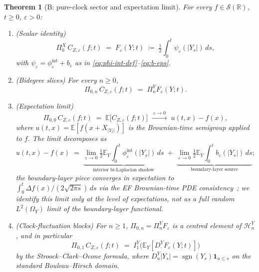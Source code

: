 \documentclass[11pt,reqno]{amsart}
\theoremstyle{plain}
\newtheorem{theorem}{Theorem}[section]
\theoremstyle{definition}
\theoremstyle{remark}
\newcommand{\R}{\mathbb{R}}
\newcommand{\E}{\mathbb{E}}
\newcommand{\Hilb}{\mathcal{H}}
\newcommand{\IBM}{Z}
\newcommand{\Pir}{\Pi}
\DeclareMathOperator{\sgn}{sgn}
\begin{document}
\begin{theorem}[B: pure-clock sector and expectation limit]
\label{thm:pure-clock}
For every $f\in\mathscr S(\R)$, $t\ge 0$, $\varepsilon>0$:
\begin{enumerate}
\item (Scalar identity)
\[
 \Pir_0^X\,C_{\IBM,\varepsilon}(f;t)
 \;=\;F_\varepsilon(Y;t)
 \;\coloneqq\;\tfrac12\!\int_0^t\!\psi_\varepsilon(|Y_s|)\,ds,
\]
with $\psi_\varepsilon=\phi_\varepsilon^{\mathrm{int}}+b_\varepsilon$
as in \eqref{eq:phi-int-def}--\eqref{eq:b-eps}.
\item (Bidegree slices) For every $n\ge 0$,
\[
 \Pir_{0,n}\,C_{\IBM,\varepsilon}(f;t)
 \;=\;\Pir_n^Y F_\varepsilon(Y;t).
\]
\item (Expectation limit)
\[
 \Pir_{0,0}\,C_{\IBM,\varepsilon}(f;t)
 \;=\;\E\!\bigl[C_{\IBM,\varepsilon}(f;t)\bigr]
 \;\xrightarrow{\;\varepsilon\to 0\;}\;u(t,x)-f(x),
\]
where $u(t,x)=\E[f(x+X_{|Y_t|})]$ is the Brownian-time semigroup
applied to $f$. The limit decomposes as
\[
 u(t,x)-f(x)
 \;=\;\underbrace{\lim_{\varepsilon\to 0}\tfrac12\!\E_Y\!\int_0^t\!\phi_\varepsilon^{\mathrm{int}}(|Y_s|)\,ds}_{\text{interior bi-Laplacian shadow}}
   \;+\;\underbrace{\lim_{\varepsilon\to 0}\tfrac12\!\E_Y\!\int_0^t\!b_\varepsilon(|Y_s|)\,ds}_{\text{boundary-layer source}};
\]
the boundary-layer piece converges in expectation to
$\int_0^t\Delta f(x)/(2\sqrt{2\pi s})\,ds$ via the EF Brownian-time
PDE consistency~\cite[Thm.\ 6.4]{Fontes-EnergyFirst}; we identify
this limit only at the level of expectations, not as a full random
$L^{2}(\Omega_Y)$ limit of the boundary-layer functional.
\item (Clock-fluctuation blocks) For $n\ge 1$,
$\Pir_{0,n}=\Pir_n^Y F_\varepsilon$ is a centred element of
$\Hilb_n^Y$, and in particular
\[
 \Pir_{0,1}\,C_{\IBM,\varepsilon}(f;t)
 \;=\;I_1^Y\!\bigl(\E_Y[D^Y_\cdot F_\varepsilon(Y;t)]\bigr)
\]
by the Stroock--Clark--Ocone formula, where
$D^Y_u|Y_s|=\sgn(Y_s)\mathbf 1_{u\le s}$ on the standard
Bouleau--Hirsch domain.
\end{enumerate}
\end{theorem}
\end{document}
